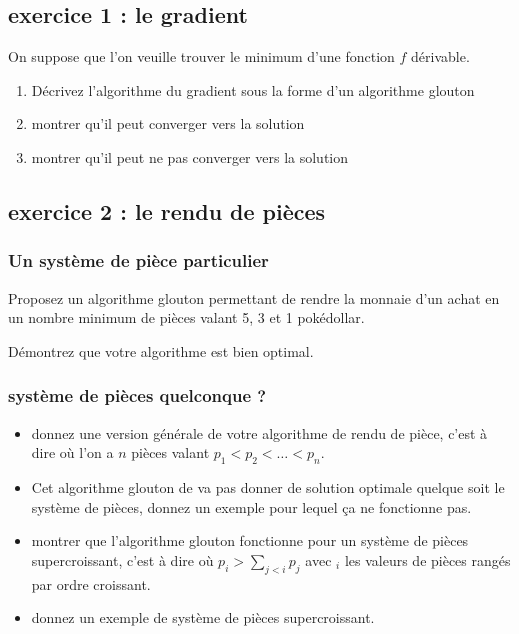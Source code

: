 \documentclass[
]{article}
\providecommand{\tightlist}{%
  \setlength{\itemsep}{0pt}\setlength{\parskip}{0pt}}
\begin{document}
\hypertarget{exercice-1-le-gradient}{%
\subsection{exercice 1 : le gradient}\label{exercice-1-le-gradient}}

On suppose que l'on veuille trouver le minimum d'une fonction \(f\)
dérivable.

\begin{enumerate}
\def\labelenumi{\arabic{enumi}.}
\tightlist
\item
  Décrivez l'algorithme du gradient sous la forme d'un algorithme
  glouton
\item
  montrer qu'il peut converger vers la solution
\item
  montrer qu'il peut ne pas converger vers la solution
\end{enumerate}

\hypertarget{exercice-2-le-rendu-de-piuxe8ces}{%
\subsection{exercice 2 : le rendu de
pièces}\label{exercice-2-le-rendu-de-piuxe8ces}}

\hypertarget{un-systuxe8me-de-piuxe8ce-particulier}{%
\subsubsection{Un système de pièce
particulier}\label{un-systuxe8me-de-piuxe8ce-particulier}}

Proposez un algorithme glouton permettant de rendre la monnaie d'un
achat en un nombre minimum de pièces valant 5, 3 et 1 pokédollar.

Démontrez que votre algorithme est bien optimal.

\hypertarget{systuxe8me-de-piuxe8ces-quelconque}{%
\subsubsection{système de pièces quelconque
?}\label{systuxe8me-de-piuxe8ces-quelconque}}

\begin{itemize}
\tightlist
\item
  donnez une version générale de votre algorithme de rendu de pièce,
  c'est à dire où l'on a \(n\) pièces valant
  \(p_1 < p_2 < \dots < p_n\).
\item
  Cet algorithme glouton de va pas donner de solution optimale quelque
  soit le système de pièces, donnez un exemple pour lequel ça ne
  fonctionne pas.
\item
  montrer que l'algorithme glouton fonctionne pour un système de pièces
  supercroissant, c'est à dire où \(p_i > \sum_{j< i} p_j\) avec \(_i\)
  les valeurs de pièces rangés par ordre croissant.
\item
  donnez un exemple de système de pièces supercroissant.
\end{itemize}
\end{document}
